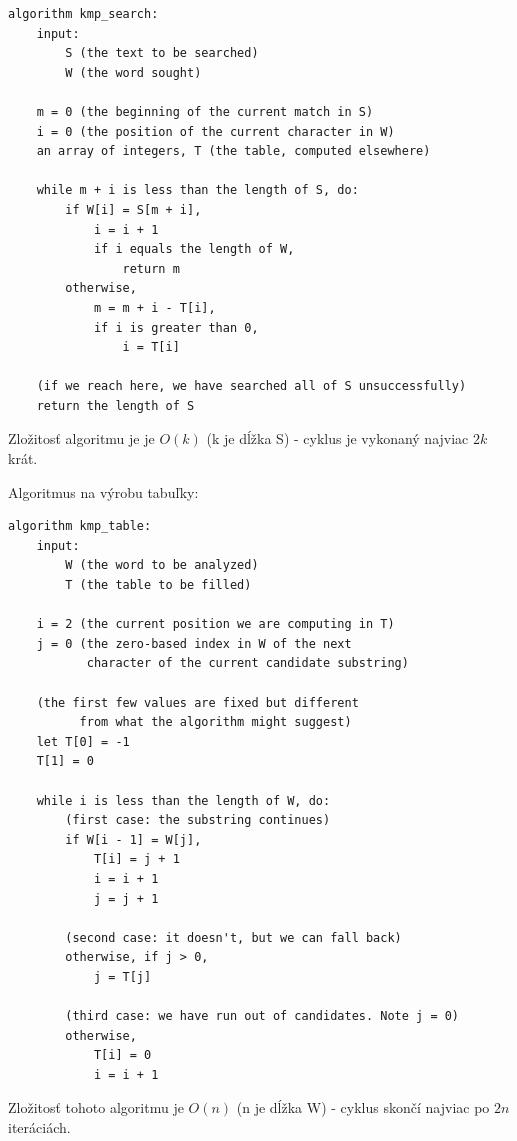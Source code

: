 \begin{verbatim}
algorithm kmp_search:
    input:
        S (the text to be searched)
        W (the word sought)

    m = 0 (the beginning of the current match in S)
    i = 0 (the position of the current character in W)
    an array of integers, T (the table, computed elsewhere)

    while m + i is less than the length of S, do:
        if W[i] = S[m + i],
            i = i + 1
            if i equals the length of W,
                return m
        otherwise,
            m = m + i - T[i],
            if i is greater than 0,
                i = T[i]

    (if we reach here, we have searched all of S unsuccessfully)
    return the length of S
\end{verbatim}

Zložitosť algoritmu je je $O(k)$ (k je dĺžka S) - cyklus je vykonaný najviac $2k$ krát.

Algoritmus na výrobu tabuľky:
\begin{verbatim}
algorithm kmp_table:
    input:
        W (the word to be analyzed)
        T (the table to be filled)

    i = 2 (the current position we are computing in T)
    j = 0 (the zero-based index in W of the next
           character of the current candidate substring)

    (the first few values are fixed but different
          from what the algorithm might suggest)
    let T[0] = -1
    T[1] = 0

    while i is less than the length of W, do:
        (first case: the substring continues)
        if W[i - 1] = W[j],
            T[i] = j + 1
            i = i + 1
            j = j + 1

        (second case: it doesn't, but we can fall back)
        otherwise, if j > 0,
            j = T[j]

        (third case: we have run out of candidates. Note j = 0)
        otherwise,
            T[i] = 0
            i = i + 1
\end{verbatim}


Zložitosť tohoto algoritmu je $O(n)$ (n je dĺžka W) - cyklus skončí najviac po $2n$ iteráciách.
